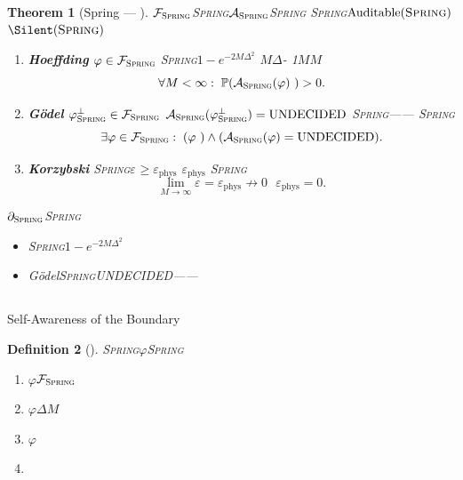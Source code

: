 \documentclass[12pt,a4paper]{article}
\newtheorem{theorem}{Theorem}[section]
\newtheorem{definition}[theorem]{Definition}
\theoremstyle{remark}
\newcommand{\Pbb}{\mathbb{P}}
\newcommand{\A}{\mathcal{A}}
\newcommand{\Fset}{\mathcal{F}}
\newcommand{\Spring}{\textsc{Spring}}
\DeclareMathOperator{\Auditable}{Auditable}
\DeclareMathOperator{\SpringBoundary}{\partial_{\mathrm{Spring}}}
\begin{document}
\begin{theorem}[Spring — ]\label{thm:boundary_theorem}
$\Fset_{\Spring}$\Spring{}$\A_{\Spring}$\Spring{}
\Spring{}$\Auditable(\Spring)$$\Silent(\Spring)$
$\SpringBoundary$

\begin{enumerate}[label=\textbf{} \arabic*, leftmargin=*, itemsep=8pt]
    \item \textbf{Hoeffding}
    $\varphi \in \Fset_{\Spring}$
    \Spring{}$1 - e^{-2M\Delta^2}$
    $M$$\Delta$-
    1$M$$M$
    \begin{equation}
        \forall M < \infty: \; \Pbb(\mathcal{A}_{\Spring}(\varphi) \text{ }) > 0.
    \end{equation}
    
    \item \textbf{G\"odel}
    $\varphi_{\Spring}^{\perp} \in \Fset_{\Spring}$
    $\mathcal{A}_{\Spring}(\varphi_{\Spring}^{\perp}) = \text{UNDECIDED}$
    \Spring{}——
    \Spring{}
    \begin{equation}
        \exists \varphi \in \Fset_{\Spring}: \; (\varphi \text{ }) \land (\mathcal{A}_{\Spring}(\varphi) = \text{UNDECIDED}).
    \end{equation}
    
    \item \textbf{Korzybski}
    \Spring{}$\varepsilon_{\text{}} \geq \varepsilon_{\text{phys}}$
    $\varepsilon_{\text{phys}}$
    \Spring{}
    \begin{equation}
        \lim_{M\to\infty} \varepsilon_{\text{}} = \varepsilon_{\text{phys}} \not\to 0 \text{  } \varepsilon_{\text{phys}} = 0\text{}.
    \end{equation}
\end{enumerate}

${\partial_{\Spring}}$\Spring{}
\begin{itemize}[itemsep=4pt]
    \item \textbf{} 
    \Spring{}$1 - e^{-2M\Delta^2}$
    \item \textbf{} 
    G\"odel\Spring{}\textsc{UNDECIDED}——
    \textbf{}
\end{itemize}
\end{theorem}

\subsection{}

\textbf{}Self-Awareness of the Boundary

\begin{definition}[]\label{def:self_awareness}
\Spring{}$\varphi$\Spring{}
\begin{enumerate}[label=(\arabic*), itemsep=2pt]
    \item $\varphi$$\Fset_{\Spring}$
    \item $\varphi$$\Delta$$M$
    \item $\varphi$
    \item 
\end{enumerate}
\end{definition}
\end{document}
